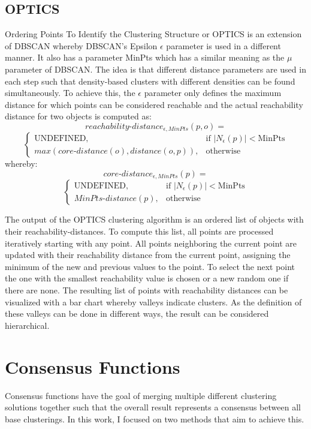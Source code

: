 \documentclass[
	a4paper,
	english,
	twoside,
	openright,               
	11pt                            
	]{report}
\begin{document}
\subsection{OPTICS}\label{sec:opticstheory}
Ordering Points To Identify the Clustering Structure or OPTICS \cite{10.1145/304181.304187} is an extension of DBSCAN whereby DBSCAN's Epsilon $\epsilon$ parameter is used in a different manner. It also has a parameter MinPts which has a similar meaning as the $\mu$ parameter of DBSCAN. The idea is that different distance parameters are used in each step such that density-based clusters with different densities can be found simultaneously. To achieve this, the  $\epsilon$ parameter only defines the maximum distance for which points can be considered reachable and the actual reachability distance for two objects is computed as:
$$reachability\text{-}distance_{\epsilon,MinPts}(p,o)=$$
$$
\begin{cases}
    \text{UNDEFINED},& \text{if } |N_\epsilon(p)|< \text{MinPts}\\
    max(core\text{-}distance(o),distance(o,p)),              & \text{otherwise}
\end{cases}
$$
whereby:
$$core\text{-}distance_{\epsilon,MinPts}(p)=$$
$$
\begin{cases}
    \text{UNDEFINED},& \text{if } |N_\epsilon(p)|< \text{MinPts}\\
    MinPts\text{-}distance(p),              & \text{otherwise}
\end{cases}
$$

The output of the OPTICS clustering algorithm is an ordered list of objects with their reachability-distances. To compute this list, all points are processed iteratively starting with any point. All points neighboring the current point are updated with their reachability distance from the current point, assigning the minimum of the new and previous values to the point. To select the next point the one with the smallest reachability value is chosen or a new random one if there are none. The resulting list of points with reachability distances can be visualized with a bar chart whereby valleys indicate clusters. As the definition of these valleys can be done in different ways, the result can be considered hierarchical.


\section{Consensus Functions}
Consensus functions have the goal of merging multiple different clustering solutions together such that the overall result represents a consensus between all base clusterings. In this work, I focused on two methods that aim to achieve this.
\end{document}
